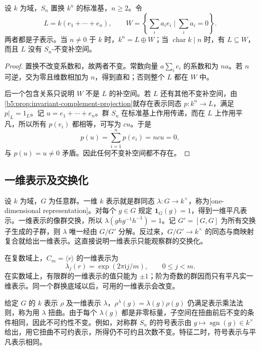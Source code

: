 \begin{example}\label{b5:exm:permutation-augmentation}
	设 \(k\) 为域，\(S_n\) 置换 \(k^n\) 的标准基，\(n\ge2\)。令
	\[
		L=k(e_1+\cdots+e_n),\qquad W=\left\{\sum_i a_ie_i\mid\sum_i a_i=0\right\}.
	\]
	两者都是子表示。当 \(n\ne0\) 于 \(k\) 时，\(k^n=L\oplus W\)；当 \(\operatorname{char}k\mid n\) 时，有 \(L\subseteq W\)，而且 \(L\) 没有 \(S_n\)-不变补空间。
\end{example}
\begin{proof}
	置换不改变系数和，故两者不变。常数向量 \(a\sum_i e_i\) 的系数和为 \(na\)。若 \(n\) 可逆，交为零且维数相加为 \(n\)，得到直和；否则整个 \(L\) 都在 \(W\) 中。

	后一个包含关系只说明 \(W\) 不是 \(L\) 的补空间。若 \(L\) 还有其他不变补空间，由\cref{b5:prop:invariant-complement-projection}就存在表示同态 \(p:k^n\to L\)，满足 \(p|_L=1_L\)。记 \(u=e_1+\cdots+e_n\)。群 \(S_n\) 在标准基上作用传递，而在 \(L\) 上作用平凡，所以所有 \(p(e_i)\) 都相等，可写为 \(cu\)。于是
	\[
		p(u)=\sum_{i=1}^np(e_i)=ncu=0,
	\]
	与 \(p(u)=u\ne0\) 矛盾。因此任何不变补空间都不存在。
\end{proof}

\subsection{一维表示及交换化}
\label{b5:subsec:0102:02}

设 \(k\) 为域，\(G\) 为任意群。一维 \(k\) 表示就是群同态 \(\lambda:G\to k^\times\)，称为[one-dimensional representation]。对每个 \(g\in G\) 规定 \(\mathbf1_G(g)=1\)，得到一维平凡表示。一维表示的像群交换，所以 \(\lambda(ghg^{-1}h^{-1})=1\)。记 \(G'=[G,G]\) 为所有交换子生成的子群，则 \(\lambda\) 唯一经由 \(G/G'\) 分解。反过来，\(G/G'\to k^\times\) 的同态与商映射复合就给出一维表示。这直接说明一维表示只能观察群的交换化。

\ProseParagraphBreak
在复数域上，\(C_m=\langle r\rangle\) 的一维表示为
\[
	\lambda_j(r)=\exp(2\pi\mathrm i j/m),\qquad 0\le j<m.
\]
在实数域上，有限群的一维表示的值只能为 \(\pm1\)；阶为奇数的群因而只有平凡实一维表示。同一个群换底域以后，可用的一维表示会改变。

\ProseParagraphBreak
给定 \(G\) 的 \(k\) 表示 \(\rho\) 及一维表示 \(\lambda\)，\(\rho^\lambda(g)=\lambda(g)\rho(g)\) 仍满足表示乘法法则，称为用 \(\lambda\) 扭曲。由于每个 \(\lambda(g)\) 都是非零标量，子空间在扭曲前后不变的条件相同，因此不可约性不变。例如，对称群 \(S_n\) 的符号表示由 \(g\mapsto\operatorname{sgn}(g)\in k^\times\) 给出，用它扭曲不可约表示，所得仍不可约且次数不变。特征二时，符号表示与平凡表示相同。

